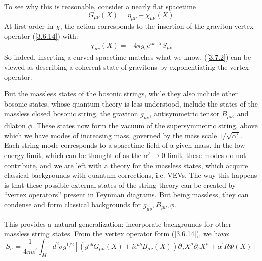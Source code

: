 To see why this is reasonable, consider a nearly flat spacetime 
\begin{equation}
	G_{\mu\nu}(X) = \eta_{\mu\nu} + \chi_{\mu\nu}(X)
\end{equation}
At first order in $\chi$, the action corresponds to the insertion of the graviton vertex operator (\ref{3.6.14}) with:
\begin{equation}
	\chi_{\mu v}(X)=-4 \pi g_{\mathrm{c}} e^{i k \cdot X} S_{\mu v}
\end{equation}
So indeed, inserting a curved spacetime matches what we know. (\ref{3.7.2}) can be viewed as describing a coherent state of gravitons by exponentiating the vertex operator.

But the massless states of the bosonic strings, while they also include other bosonic states, whose quantum theory is less understood, include the states of the massless closed bosonic string, the graviton \( g_{\mu\nu} \), antisymmetric tensor \( B_{\mu\nu} \), and dilaton \( \phi \). These states now form the vacuum of the supersymmetric string, above which we have modes of increasing mass, governed by the mass scale \( 1/\sqrt{\alpha'} \). Each string mode corresponds to a spacetime field of a given mass. In the low energy limit, which can be thought of as the \( \alpha' \to 0 \) limit, these modes do not contribute, and we are left with a theory for the massless states, which acquire classical backgrounds with quantum corrections, i.e. VEVs. The way this happens is that these possible external states of the string theory can be created by ``vertex operators'' present in Feynman diagrams. But being massless, they can condense and form classical backgrounds for \( g_{\mu\nu}, B_{\mu\nu}, \phi \).

This provides a natural generalization: incorporate backgrounds for other massless string states. From the vertex operator form (\ref{3.6.14}), we have:
\begin{equation}\label{3.7.6}
	S_{\sigma}=\frac{1}{4 \pi \alpha^{\prime}} \int_{M} d^{2} \sigma g^{1 / 2}\left[\left(g^{a b} G_{\mu \nu}(X)+i \epsilon^{a b} B_{\mu \nu}(X)\right) \partial_{a} X^{\mu} \partial_{b} X^{v}+\alpha^{\prime} R \Phi(X)\right]
\end{equation}

